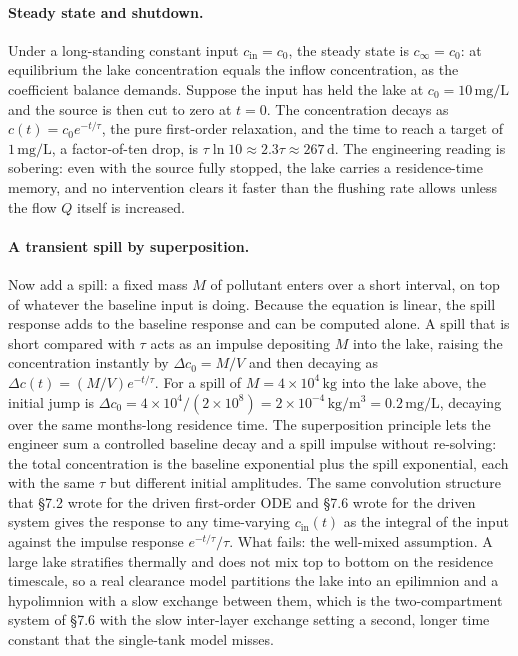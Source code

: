 \paragraph{Steady state and shutdown.} Under a long-standing constant
input $c_{\text{in}} = c_{0}$, the steady state is $c_{\infty} = c_{0}$:
at equilibrium the lake concentration equals the inflow concentration,
as the coefficient balance demands. Suppose the input has held the lake
at $c_{0} = 10\,\si{\milli\gram\per\liter}$ and the source is then cut to
zero at $t = 0$. The concentration decays as $c(t) = c_{0} e^{-t/\tau}$,
the pure first-order relaxation, and the time to reach a target of
$1\,\si{\milli\gram\per\liter}$, a factor-of-ten drop, is $\tau\ln 10
\approx 2.3\tau \approx 267\,\si{\day}$. The engineering reading is
sobering: even with the source fully stopped, the lake carries a
residence-time memory, and no intervention clears it faster than the
flushing rate allows unless the flow $Q$ itself is increased.

\paragraph{A transient spill by superposition.} Now add a spill: a fixed
mass $M$ of pollutant enters over a short interval, on top of whatever
the baseline input is doing. Because the equation is linear, the spill
response adds to the baseline response and can be computed alone. A spill
that is short compared with $\tau$ acts as an impulse depositing $M$ into
the lake, raising the concentration instantly by $\Delta c_{0} = M/V$ and
then decaying as $\Delta c(t) = (M/V) e^{-t/\tau}$. For a spill of $M =
4\times 10^{4}\,\si{\kilogram}$ into the lake above, the initial jump is
$\Delta c_{0} = 4\times 10^{4}/(2\times 10^{8}) = 2\times 10^{-4}\,\si{
\kilogram\per\meter\cubed} = 0.2\,\si{\milli\gram\per\liter}$, decaying
over the same months-long residence time. The superposition principle
lets the engineer sum a controlled baseline decay and a spill impulse
without re-solving: the total concentration is the baseline exponential
plus the spill exponential, each with the same $\tau$ but different
initial amplitudes. The same convolution structure that \S7.2 wrote for
the driven first-order ODE and \S7.6 wrote for the driven system gives
the response to any time-varying $c_{\text{in}}(t)$ as the integral of
the input against the impulse response $e^{-t/\tau}/\tau$. What fails:
the well-mixed assumption. A large lake stratifies thermally and does not
mix top to bottom on the residence timescale, so a real clearance model
partitions the lake into an epilimnion and a hypolimnion with a slow
exchange between them, which is the two-compartment system of \S7.6 with
the slow inter-layer exchange setting a second, longer time constant that
the single-tank model misses.

